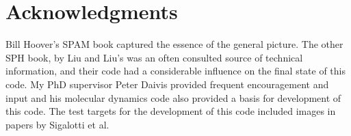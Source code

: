 \documentclass[ twoside,openright,titlepage,fleqn,%
                pointlessnumbers,headinclude,BCOR5mm,%
                10pt,a4paper,footinclude,cleardoubleempty,abstractoff
                ]{scrreprt}
\begin{document}
\bigskip
\begingroup
\let\clearpage\relax
\let\cleardoublepage\relax
\let\cleardoublepage\relax
\chapter*{Acknowledgments}
Bill Hoover's SPAM book captured the essence of the general picture.
The other SPH book, by Liu and Liu's was an often consulted source of technical
information, and their code had a considerable influence on the final state of this
code. My PhD supervisor Peter Daivis provided frequent encouragement and input
and his molecular dynamics code also provided a basis for development of this code.
The test targets for the development of this code included images in papers by Sigalotti et al.
\endgroup


\pagestyle{scrheadings}
\cleardoublepage

{}
\setcounter{tocdepth}{2}
\tableofcontents
\markboth{\spacedlowsmallcaps{\contentsname}}{\spacedlowsmallcaps{\contentsname}} 
\clearpage

\begingroup 
    \let\clearpage\relax
    \let\cleardoublepage\relax
    \let\cleardoublepage\relax
    \listoffigures

    \vspace*{8ex}

    \listoftables
        
\end{document}
